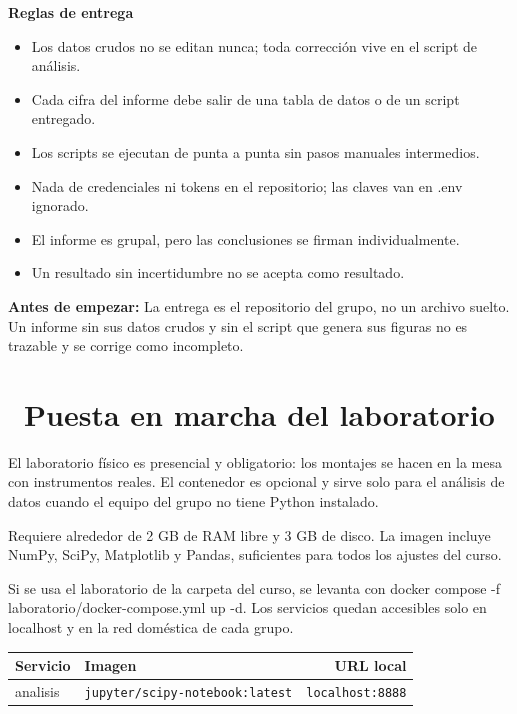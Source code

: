 \documentclass[11pt,a4paper]{article}
\newcommand{\iconotexto}[2]{\textcolor{cyanNeon}{\faIcon{#1}}~#2}
\begin{document}
\textbf{Reglas de entrega}

\begin{itemize}[leftmargin=1.4em,itemsep=2pt,topsep=3pt]
  \item Los datos crudos no se editan nunca; toda corrección vive en el script de análisis.
  \item Cada cifra del informe debe salir de una tabla de datos o de un script entregado.
  \item Los scripts se ejecutan de punta a punta sin pasos manuales intermedios.
  \item Nada de credenciales ni tokens en el repositorio; las claves van en .env ignorado.
  \item El informe es grupal, pero las conclusiones se firman individualmente.
  \item Un resultado sin incertidumbre no se acepta como resultado.
\end{itemize}

\begin{tcolorbox}[cajaMejora]\textbf{Antes de empezar:} La entrega es el repositorio del grupo, no un archivo suelto. Un informe sin sus datos crudos y sin el script que genera sus figuras no es trazable y se corrige como incompleto.
\end{tcolorbox}

\section{\iconotexto{cube}{Puesta en marcha del laboratorio}}

El laboratorio físico es presencial y obligatorio: los montajes se hacen en la mesa con instrumentos reales. El contenedor es opcional y sirve solo para el análisis de datos cuando el equipo del grupo no tiene Python instalado.

Requiere alrededor de 2 GB de RAM libre y 3 GB de disco. La imagen incluye NumPy, SciPy, Matplotlib y Pandas, suficientes para todos los ajustes del curso.

Si se usa el laboratorio de la carpeta del curso, se levanta con docker compose -f laboratorio/docker-compose.yml up -d. Los servicios quedan accesibles solo en localhost y en la red doméstica de cada grupo.

\begin{tabularx}{\linewidth}{@{}l l r@{}}
\toprule
Servicio & Imagen & URL local\\
\midrule
analisis & \texttt{jupyter/scipy-notebook:latest} & \texttt{localhost:8888} \\
\bottomrule
\end{tabularx}
\end{document}
